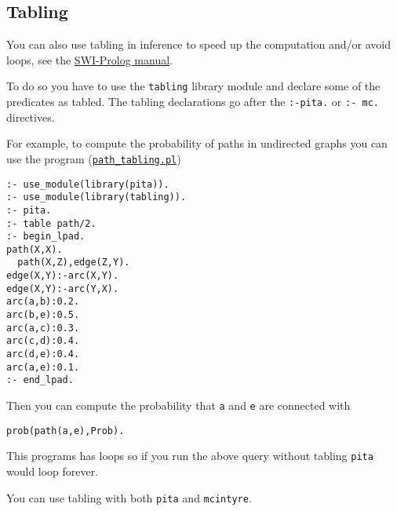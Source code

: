 \subsection{Tabling}
You can also use tabling in inference to speed up the computation and/or avoid loops, see
the \href{http://www.swi-prolog.org/pldoc/man?section=tabling}{SWI-Prolog manual}.

To do so you have to use the \verb|tabling| library module and declare some of the predicates
as tabled. The tabling declarations go after the \verb|:-pita.| or \verb|:- mc.| directives.

For example, to compute the probability of paths in undirected graphs you can use
the program (\href{http://cplint.lamping.unife.it/example/inference/path_tabling.pl}{\texttt{path\_tabling.pl}})
\begin{verbatim}
:- use_module(library(pita)).
:- use_module(library(tabling)).
:- pita.
:- table path/2.
:- begin_lpad.
path(X,X).
  path(X,Z),edge(Z,Y).
edge(X,Y):-arc(X,Y).
edge(X,Y):-arc(Y,X).
arc(a,b):0.2.
arc(b,e):0.5.
arc(a,c):0.3.
arc(c,d):0.4.
arc(d,e):0.4.
arc(a,e):0.1.
:- end_lpad.
\end{verbatim}
Then you can compute the probability that \verb|a| and \verb|e| are connected with
\begin{verbatim}
prob(path(a,e),Prob).
\end{verbatim}
This programs has loops so if you run the above query without tabling \verb|pita| would loop forever.

You can use tabling with both \verb|pita| and \verb|mcintyre|.

